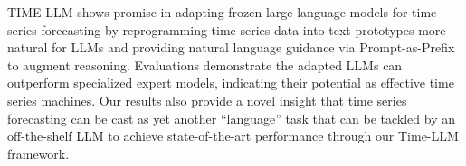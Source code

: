 TIME-LLM shows promise in adapting frozen large language models for time series forecasting by reprogramming time series data into text prototypes more natural for LLMs and providing natural language guidance via Prompt-as-Prefix to augment reasoning. Evaluations demonstrate the adapted LLMs can outperform specialized expert models, indicating their potential as effective time series machines. Our results also provide a novel insight that time series forecasting can be cast as yet another ``language'' task that can be tackled by an off-the-shelf LLM to achieve state-of-the-art performance through our Time-LLM framework. 
